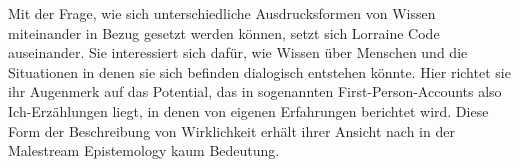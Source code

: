 Mit der Frage, wie sich unterschiedliche Ausdrucksformen von Wissen miteinander
in Bezug gesetzt werden können, setzt sich Lorraine Code auseinander. Sie
interessiert sich dafür,  wie Wissen über Menschen und die  Situationen in
denen sie sich befinden dialogisch entstehen könnte. Hier richtet sie ihr
Augenmerk auf das Potential, das in sogenannten First-Person-Accounts also
Ich-Erzählungen liegt, in denen von eigenen Erfahrungen berichtet wird. Diese
Form der Beschreibung von Wirklichkeit erhält ihrer Ansicht nach in der
Malestream Epistemology kaum Bedeutung.\footnotemark {}
